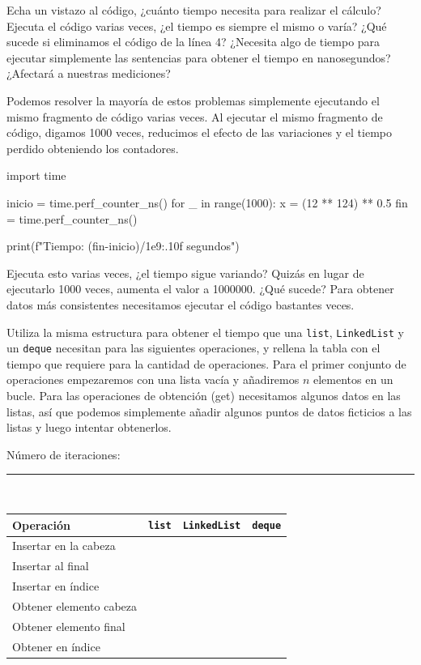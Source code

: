 \documentclass[10pt,a4paper]{article}
\begin{document}
Echa un vistazo al código, ¿cuánto tiempo necesita para realizar el cálculo? Ejecuta el código varias veces, ¿el tiempo es siempre el mismo o varía? ¿Qué sucede si eliminamos el código de la línea 4? ¿Necesita algo de tiempo para ejecutar simplemente las sentencias para obtener el tiempo en nanosegundos? ¿Afectará a nuestras mediciones?

Podemos resolver la mayoría de estos problemas simplemente ejecutando el mismo fragmento de código varias veces. Al ejecutar el mismo fragmento de código, digamos 1000 veces, reducimos el efecto de las variaciones y el tiempo perdido obteniendo los contadores.

\begin{attachedlisting}[time]
import time

inicio = time.perf_counter_ns()
for _ in range(1000):
    x = (12 ** 124) ** 0.5
fin = time.perf_counter_ns()

print(f"Tiempo: {(fin-inicio)/1e9:.10f} segundos")
\end{attachedlisting}

Ejecuta esto varias veces, ¿el tiempo sigue variando? Quizás en lugar de ejecutarlo 1000 veces, aumenta el valor a 1000000. ¿Qué sucede? Para obtener datos más consistentes necesitamos ejecutar el código bastantes veces.

Utiliza la misma estructura para obtener el tiempo que una \lstinline|list|, \lstinline|LinkedList| y un \lstinline|deque| necesitan para las siguientes operaciones, y rellena la tabla con el tiempo que requiere para la cantidad de operaciones. Para el primer conjunto de operaciones empezaremos con una lista vacía y añadiremos $n$ elementos en un bucle. Para las operaciones de obtención (get) necesitamos algunos datos en las listas, así que podemos simplemente añadir algunos puntos de datos ficticios a las listas y luego intentar obtenerlos.

\newpage
Número de iteraciones: \rule{3cm}{0.15mm}\\

\begin{table}[h!bt]
\renewcommand{\arraystretch}{1.4}
\centering
\begin{tabular}{m{}m{}m{}m{}}
\toprule
Operación & \lstinline|list| & \lstinline|LinkedList| & \lstinline|deque| \\
\midrule
Insertar en la cabeza & & &\\
Insertar al final & & &\\
Insertar en índice & & &\\
\midrule
Obtener elemento cabeza & & &\\
Obtener elemento final & & &\\
Obtener en índice & & &\\
\bottomrule
\end{tabular}
\end{table}
\end{document}

